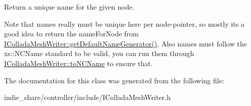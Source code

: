 Return a unique name for the given node. 

Note that names really must be unique here per node-\/pointer, so mostly it\textquotesingle{}s a good idea to return the name\+For\+Node from \hyperlink{classirr_1_1scene_1_1IColladaMeshWriter_acd10fcf2458271d59cf76284613288f6}{I\+Collada\+Mesh\+Writer\+::get\+Default\+Name\+Generator()}. Also names must follow the xs\+::\+N\+C\+Name standard to be valid, you can run them through \hyperlink{classirr_1_1scene_1_1IColladaMeshWriter_ac9c48beab095aa6f4cb4f696bb2ecd45}{I\+Collada\+Mesh\+Writer\+::to\+N\+C\+Name} to ensure that. 

The documentation for this class was generated from the following file\+:\begin{DoxyCompactItemize}
\item 
indie\+\_\+share/controller/include/I\+Collada\+Mesh\+Writer.\+h\end{DoxyCompactItemize}
